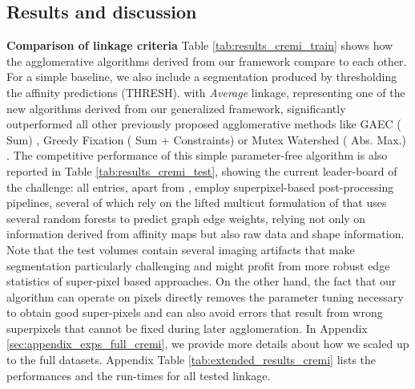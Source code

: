 \subsection{Results and discussion}\label{sec:results}
\textbf{Comparison of linkage criteria} Table \ref{tab:results_cremi_train} shows how the agglomerative algorithms derived from our framework compare to each other. For a simple baseline, we also include a segmentation produced by thresholding the affinity predictions (THRESH).
\algname{} with \emph{Average} linkage, representing one of the new algorithms derived from our generalized framework, significantly outperformed all other previously proposed agglomerative methods like GAEC (\algname{} Sum) \cite{keuper2015efficient}, Greedy Fixation (\algname{} Sum + Constraints) \cite{levinkov2017comparative} or Mutex Watershed (\algname{} Abs. Max.) \cite{wolf2018mutex}. The competitive performance of this simple parameter-free algorithm is also reported in Table \ref{tab:results_cremi_test}, showing the current leader-board of the challenge: all entries, apart from \algname{}, employ superpixel-based post-processing pipelines, several of which rely on the lifted multicut formulation of \cite{beier2017multicut} that uses several random forests to predict graph edge weights, relying not only on information derived from affinity maps but also raw data and shape information.
Note that the test volumes contain several imaging artifacts that make segmentation particularly challenging and might profit from more robust edge statistics of super-pixel based approaches.
On the other hand, the fact that our algorithm can operate on pixels directly removes the parameter tuning necessary to obtain good super-pixels and can also avoid errors that result from wrong superpixels that cannot be fixed during later agglomeration.
In Appendix \ref{sec:appendix_exps_full_cremi}, we provide more details about how we scaled up \algname{} to the full datasets. Appendix Table \ref{tab:extended_results_cremi} lists the performances and the run-times for all tested \algname{} linkage.





